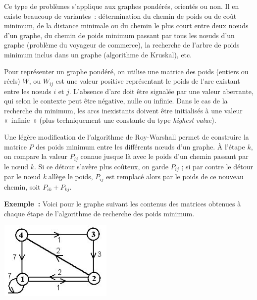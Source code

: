 		Ce type de problèmes s'applique aux graphes pondérés, 
		orientés ou non. Il en existe beaucoup de variantes~:
		détermination du chemin de poids ou de coût minimum, 
		de la distance minimale ou du chemin le plus court entre deux
		n{\oe}uds d'un graphe, du chemin de poids minimum passant 
		par tous les n{\oe}uds d'un graphe (problème du voyageur de
		commerce), la recherche de l'arbre de poids minimum 
		inclus dans un graphe (algorithme de Kruskal), etc.

		Pour représenter un graphe pondéré, on utilise une matrice 
		des poids (entiers ou réels) $W$, ou $W_{ij}$ est
		une valeur positive représentant le poids de l'arc existant 
		entre les n{\oe}uds $i$ et $j$. L'absence d'arc doit être signalée 
		par une valeur aberrante, qui selon le contexte peut être négative, 
		nulle ou infinie. Dans le cas de la recherche du minimum, les arcs 
		inexistants doivent être initialisés à une valeur «~infinie~» (plus
		techniquement une constante du type \textit{highest value}).

		Une légère modification de l'algorithme de Roy-Warshall permet de 
		construire la matrice $P$ des poids minimum entre les différents
		n{\oe}uds d'un graphe. À l'étape $k$, on compare la valeur $P_{ij}$
		connue jusque là avec le poids d'un chemin passant par le n{\oe}ud $k$. 
		Si ce détour s'avère plus coûteux, on garde $P_{ij}$ ; 
		si par contre le détour par le n{\oe}ud \textit{k} allège le poids, 
		$P_{ij}$ est remplacé alors par le poids de ce nouveau chemin, 
		soit $P_{ik} + P_{kj}$. 
		

		\textbf{Exemple~:} Voici pour le graphe suivant les contenus des matrices 
		obtenues à chaque étape de l'algorithme de recherche des poids minimum. 

		\begin{center}
		\includegraphics[width=5.5cm,height=3.782cm]{image/a2012Logique2eme-img053.jpg}
		\end{center}

